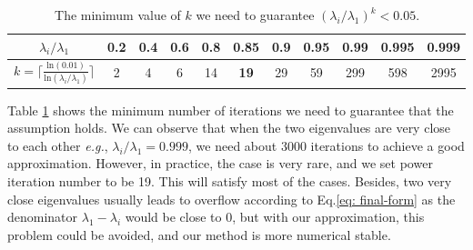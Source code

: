 \documentclass{article}
\begin{document}
\begin{table}[!htb]
\begin{center}
\begin{tabular}{ccccccccccc}
\hline
$\lambda_i/\lambda_1$ & 0.2 & 0.4 & 0.6 & 0.8 & \textbf{0.85} & 0.9 & 0.95 & 0.99 & 0.995 & 0.999 \\ \hline
$k = \lceil \frac{\text{ln}(0.01)}{\text{ln}(\lambda_i/\lambda_1)} \rceil $     & 2   & 4   & 6   & 14  & \textbf{19}   & 29  & 59   & 299  & 598   & 2995  \\ \hline
\end{tabular}
\caption{The minimum value of $k$ we need to guarantee $(\lambda_i/\lambda_1)^k<0.05$.}
\label{tab: kmin}
\end{center}
\end{table}

Table \ref{tab: kmin} shows the minimum number of iterations we need to guarantee that the assumption holds. We can observe that when the two eigenvalues are very close to each other \emph{e.g.}, $\lambda_i/\lambda_1=0.999$, we need about 3000 iterations to achieve a good approximation. However, in practice, the case is very rare, and we set power iteration number to be 19. This will satisfy most of the cases. Besides, two very close eigenvalues usually leads to overflow according to Eq.\ref{eq: final-form} as the denominator $\lambda_1 - \lambda_i$ would be close to 0, but with our approximation, this problem could be avoided, and our method is more numerical stable.


\medskip
\small


\end{document}

